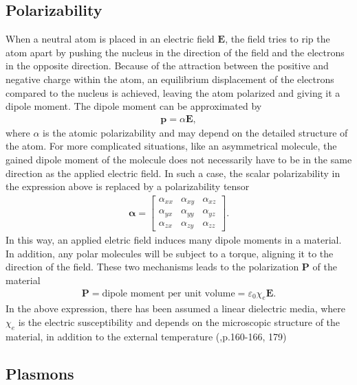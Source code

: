 \subsection{Polarizability}
When a neutral atom is placed in an electric field $\boldsymbol{E}$, the field tries to rip the
atom apart by pushing the nucleus in the direction of the field and the electrons in the opposite direction.
Because of the attraction between the positive and negative charge within the atom, an equilibrium displacement
of the electrons compared to the nucleus is achieved, leaving the atom polarized and giving it a
dipole moment. The dipole moment can be approximated by
\begin{align}
   \boldsymbol{p} = \alpha \boldsymbol{E},
\end{align}
where $\alpha$ is the atomic polarizability and may depend on the detailed structure of the atom.
For more complicated situations, like an asymmetrical molecule, the gained dipole moment of the 
molecule does not necessarily have to be in the same direction as the applied electric field.
In such a case, the scalar polarizability in the expression above is replaced by a polarizability tensor
\begin{align}
   \boldsymbol{\alpha} = 
\begin{bmatrix}
   \alpha_{xx}   &   \alpha_{xy}  &  \alpha_{xz}  \\
   \alpha_{yx}   &   \alpha_{yy}  &  \alpha_{yz}  \\
   \alpha_{zx}   &   \alpha_{zy}  &  \alpha_{zz} 
\end{bmatrix}
.
\end{align}
In this way, an applied eletric field induces many dipole moments in a material. In addition,
any polar molecules will be subject to a torque, aligning it to the direction of the field.
These two mechanisms leads to the polarization $\boldsymbol{P}$ of the material
\begin{align}
   \boldsymbol{P} = \text{dipole moment per unit volume} = \varepsilon_0 \chi_e \boldsymbol{E}.
\end{align}
In the above expression, there has been assumed a linear dielectric media, where $\chi_e$ is the electric 
susceptibility and depends on the microscopic structure of the material, in addition to the external 
temperature (\cite{Griffiths},p.160-166, 179)



\subsection{Plasmons}


